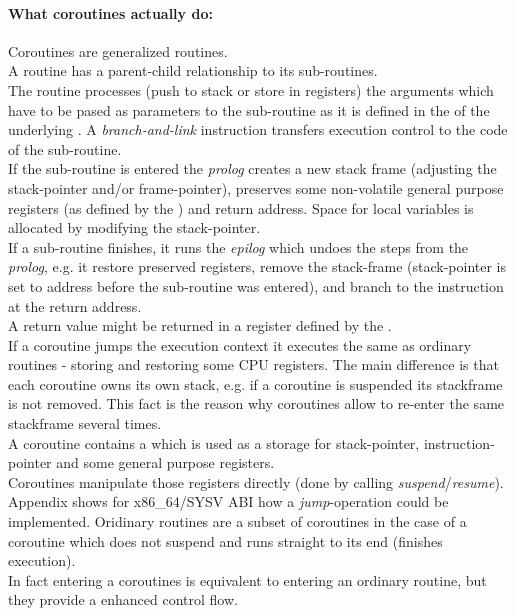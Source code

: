 \paragraph*{What coroutines actually do:}
Coroutines are generalized routines.\\
\newline
A routine has a parent-child relationship to its sub-routines.\\
The routine processes (push to stack or store in registers) the arguments which
have to be pased as parameters to the sub-routine as it is defined in the \cv
of the underlying \ABI. A \textit{branch-and-link} instruction transfers
execution control to the code of the sub-routine.\\
If the sub-routine is entered the \textit{prolog} creates a new stack frame
(adjusting the stack-pointer and/or frame-pointer), preserves some
non-volatile general purpose registers (as defined by the \cv) and return
address. Space for local variables is allocated by modifying the
stack-pointer.\\
If a sub-routine  finishes, it runs the \textit{epilog} which undoes the steps
from the \textit{prolog}, e.g. it restore preserved registers, remove the
stack-frame (stack-pointer is set to address before the sub-routine was entered),
and branch to the instruction at the return address.\\
A return value might be returned in a register defined by the \cv.\\
\newline
If a coroutine jumps the execution context it executes the same as
ordinary routines - storing and restoring some CPU registers. The main
difference is that each coroutine owns its own stack, e.g. if a coroutine is
suspended its stackframe is not removed. This fact is the reason why coroutines
allow to re-enter the same stackframe several times.\\ A coroutine contains a
\cblock which is used as a storage for stack-pointer, instruction-pointer and
some general purpose registers.\\ Coroutines manipulate those registers directly
(done by calling \textit{suspend}/\textit{resume}).\\
Appendix  shows for x86\_64/SYSV ABI how a
\textit{jump}-operation could be implemented.
\newline
Oridinary routines are a subset of coroutines in the case of a coroutine which
does not suspend and runs straight to its end (finishes execution).\\
\newline
In fact entering a coroutines is equivalent to entering an ordinary routine, but
they provide a enhanced control flow.

